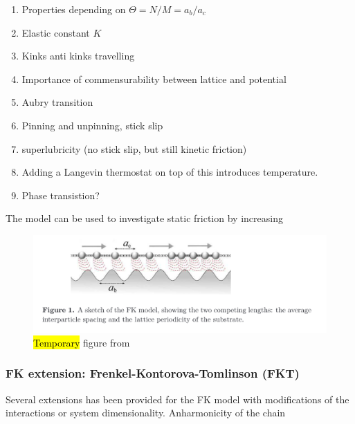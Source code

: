 \begin{enumerate}
  \item Properties depending on $\Theta = N/M = a_b/a_c$
  \item Elastic constant $K$
  \item Kinks anti kinks travelling
  \item Importance of commensurability between lattice and potential 
  \item Aubry transition
  \item Pinning and unpinning, stick slip
  \item superlubricity (no stick slip, but still kinetic friction)
  \item Adding a Langevin thermostat on top of this introduces temperature. 
  \item Phase transistion?
\end{enumerate}

The model can be used to investigate static friction by increasing 



\begin{figure}[H]
  \centering
  \includegraphics[width=0.8\linewidth]{figures/theory/FK_model.png}
  \caption{\hl{Temporary} figure from \cite{Manini_2016}}
  \label{fig:FK_model}
\end{figure}



\subsubsection{FK extension: Frenkel-Kontorova-Tomlinson (FKT)}

Several extensions has been provided for the FK model with modifications of the interactions or system dimensionality. Anharmonicity of the chain 




